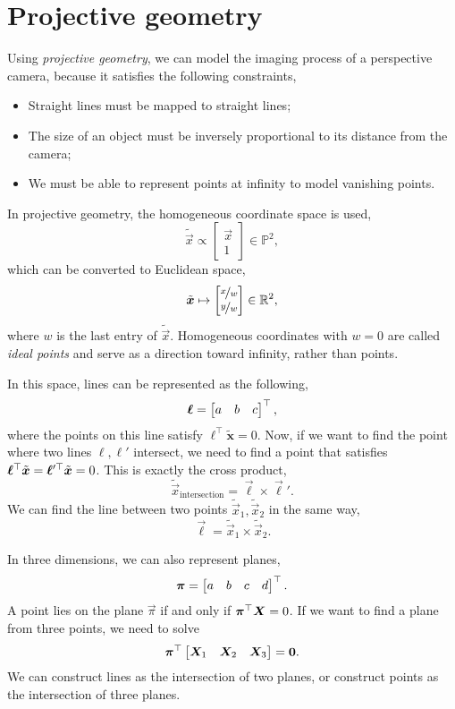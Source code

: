 \section{Projective geometry} \label{sec:projective-geometry}

Using \textit{projective geometry}, we can model the imaging process of a
perspective camera, because it satisfies the following
constraints,
\begin{itemize}
    \item Straight lines must be mapped to straight lines;
    \item The size of an object must be inversely proportional to its distance
          from the camera;
    \item We must be able to represent points at infinity to model vanishing
          points.
\end{itemize}
In projective geometry, the homogeneous coordinate space is used, \[
    \tilde{\vec{x}} \propto \begin{bmatrix} \vec{x} \\ 1 \end{bmatrix} \in \mathbb{P}^2,
\]
which can be converted to Euclidean space, \[
    \tilde{\bm{x}} \mapsto \begin{bmatrix} \nicefrac{x}{w} \\ \nicefrac{y}{w} \end{bmatrix} \in \mathbb{R}^2,
\]
where $w$ is the last entry of $\tilde{\vec{x}}$. Homogeneous coordinates with
$w=0$ are called \textit{ideal points} and serve as a direction toward infinity,
rather than points.

In this space, lines can be represented as the following, \[
    \bm{\ell} = \begin{bmatrix} a & b & c \end{bmatrix}^\top,
\]
where the points on this line satisfy $\bm{\ell}^\top\tilde{\bm{x}}=0$. Now,
if we want to find the point where two lines $\bm{\ell},\bm{\ell}'$
intersect, we need to find a point that satisfies
$\bm{\ell}^\top \tilde{\bm{x}} = \bm{\ell}'^\top\tilde{\bm{x}} = 0$. This is
exactly the cross product, \[
    \tilde{\vec{x}}_{\text{intersection}} = \vec{\ell} \times \vec{\ell}'.
\]
We can find the line between two points $\tilde{\vec{x}}_1,\tilde{\vec{x}}_2$
in the same way, \[
    \vec{\ell} = \tilde{\vec{x}}_1 \times \tilde{\vec{x}}_2.
\]

In three dimensions, we can also represent planes, \[
    \bm{\pi} = \begin{bmatrix} a & b & c & d \end{bmatrix}^\top.
\]
A point lies on the plane $\vec{\pi}$ if and only if $\bm{\pi}^\top
    \bm{X}=0$.  If we want to find a plane from three points, we need to solve \[
    \bm{\pi}^\top \begin{bmatrix} \bm{X}_1 & \bm{X}_2 & \bm{X}_3 \end{bmatrix} = \bm{0}.
\]
We can construct lines as the intersection of two planes, or construct
points as the intersection of three planes.

